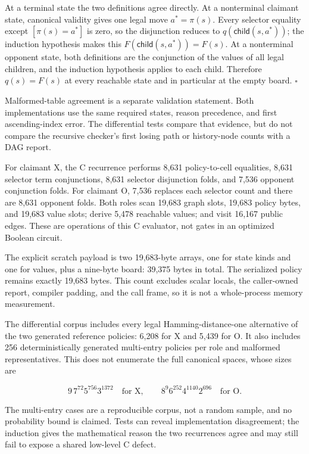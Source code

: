 At a terminal state the two definitions agree directly. At a nonterminal
claimant state, canonical validity gives one legal move
$a^*=\pi(s)$. Every selector equality except $[\pi(s)=a^*]$ is zero, so the
disjunction reduces to $q(\mathsf{child}(s,a^*))$; the induction hypothesis
makes this $F(\mathsf{child}(s,a^*))=F(s)$. At a nonterminal opponent state,
both definitions are the conjunction of the values of all legal children, and
the induction hypothesis applies to each child. Therefore $q(s)=F(s)$ at every
reachable state and in particular at the empty board. $\square$

Malformed-table agreement is a separate validation statement. Both
implementations use the same required states, reason precedence, and first
ascending-index error. The differential tests compare that evidence, but do
not compare the recursive checker's first losing path or history-node counts
with a DAG report.

For claimant X, the C recurrence performs 8,631 policy-to-cell equalities,
8,631 selector term conjunctions, 8,631 selector disjunction folds, and 7,536
opponent conjunction folds. For claimant O, 7,536 replaces each selector
count and there are 8,631 opponent folds. Both roles scan 19,683 graph slots,
19,683 policy bytes, and 19,683 value slots; derive 5,478 reachable values; and
visit 16,167 public edges. These are operations of this C evaluator, not gates
in an optimized Boolean circuit.

The explicit scratch payload is two 19,683-byte arrays, one for state kinds and
one for values, plus a nine-byte board: 39,375 bytes in total. The serialized
policy remains exactly 19,683 bytes. This count excludes scalar locals, the
caller-owned report, compiler padding, and the call frame, so it is not a
whole-process memory measurement.

The differential corpus includes every legal Hamming-distance-one alternative
of the two generated reference policies: 6,208 for X and 5,439 for O. It also
includes 256 deterministically generated multi-entry policies per role and
malformed representatives. This does not enumerate the full canonical spaces,
whose sizes are

\[
  9\,7^{72}5^{756}3^{1372}
  \quad\text{for X},\qquad
  8^9 6^{252}4^{1140}2^{696}
  \quad\text{for O}.
\]

The multi-entry cases are a reproducible corpus, not a random sample, and no
probability bound is claimed. Tests can reveal implementation disagreement;
the induction gives the mathematical reason the two recurrences agree and may
still fail to expose a shared low-level C defect.

